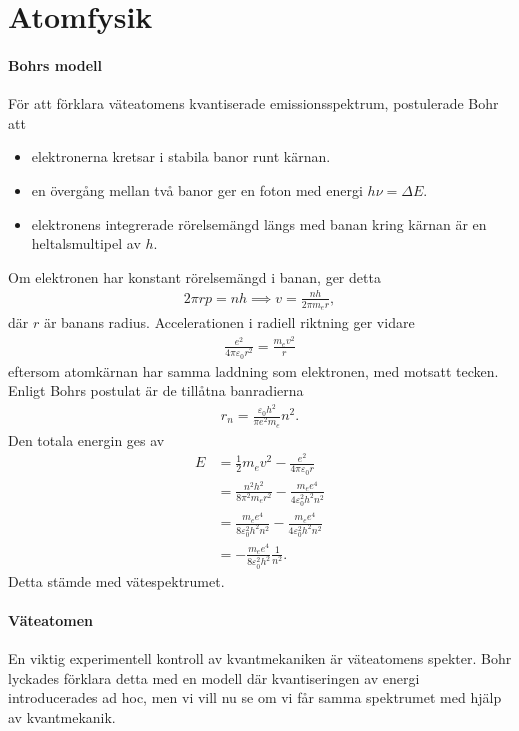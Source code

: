 \section{Atomfysik}

\paragraph{Bohrs modell}
För att förklara väteatomens kvantiserade emissionsspektrum, postulerade Bohr att
\begin{itemize}
	\item elektronerna kretsar i stabila banor runt kärnan.
	\item en övergång mellan två banor ger en foton med energi $h\nu = \Delta E$.
	\item elektronens integrerade rörelsemängd längs med banan kring kärnan är en heltalsmultipel av $h$.
\end{itemize}
Om elektronen har konstant rörelsemängd i banan, ger detta
\begin{align*}
	2\pi rp = nh \implies v = \frac{nh}{2\pi m_{e}r},
\end{align*}
där $r$ är banans radius. Accelerationen i radiell riktning ger vidare
\begin{align*}
	\frac{e^{2}}{4\pi\varepsilon_{0}r^{2}} = \frac{m_{e}v^{2}}{r}
\end{align*}
eftersom atomkärnan har samma laddning som elektronen, med motsatt tecken. Enligt Bohrs postulat är de tillåtna banradierna
\begin{align*}
	r_{n} = \frac{\varepsilon_{0}h^{2}}{\pi e^{2}m_{e}}n^{2}.
\end{align*}
Den totala energin ges av
\begin{align*}
	E &= \frac{1}{2}m_{e}v^{2} - \frac{e^{2}}{4\pi\varepsilon_{0}r} \\
	  &= \frac{n^{2}h^{2}}{8\pi^{2}m_{e}r^{2}} - \frac{m_{e}e^{4}}{4\varepsilon_{0}^{2}h^{2}n^{2}} \\
	  &= \frac{m_{e}e^{4}}{8\varepsilon_{0}^{2}h^{2}n^{2}} - \frac{m_{e}e^{4}}{4\varepsilon_{0}^{2}h^{2}n^{2}} \\
	  &= -\frac{m_{e}e^{4}}{8\varepsilon_{0}^{2}h^{2}}\frac{1}{n^{2}}.
\end{align*}
Detta stämde med vätespektrumet.

\paragraph{Väteatomen}
En viktig experimentell kontroll av kvantmekaniken är väteatomens spekter. Bohr lyckades förklara detta med en modell där kvantiseringen av energi introducerades ad hoc, men vi vill nu se om vi får samma spektrumet med hjälp av kvantmekanik.

